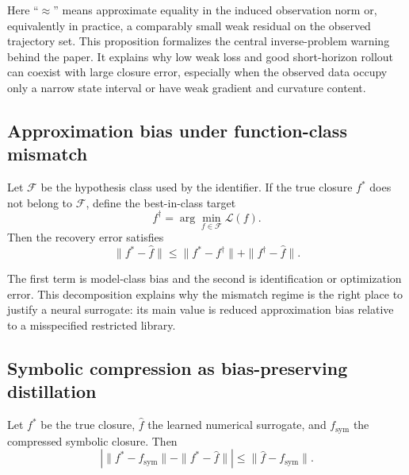 Here ``$\approx$'' means approximate equality in the induced observation norm or, equivalently in practice, a comparably small weak residual on the observed trajectory set. This proposition formalizes the central inverse-problem warning behind the paper. It explains why low weak loss and good short-horizon rollout can coexist with large closure error, especially when the observed data occupy only a narrow state interval or have weak gradient and curvature content.

\subsection{Approximation bias under function-class mismatch}

\begin{proposition}
Let $\mathcal{F}$ be the hypothesis class used by the identifier. If the true closure $f^\ast$ does not belong to $\mathcal{F}$, define the best-in-class target
\begin{equation}
f^\dagger = \arg \min_{f \in \mathcal{F}} \mathcal{L}(f).
\end{equation}
Then the recovery error satisfies
\begin{equation}
\|f^\ast - \widehat{f}\|
\le
\|f^\ast - f^\dagger\|
+ \|f^\dagger - \widehat{f}\|.
\end{equation}
\end{proposition}

The first term is model-class bias and the second is identification or optimization error. This decomposition explains why the mismatch regime is the right place to justify a neural surrogate: its main value is reduced approximation bias relative to a misspecified restricted library.

\subsection{Symbolic compression as bias-preserving distillation}

\begin{proposition}
Let $f^\ast$ be the true closure, $\widehat{f}$ the learned numerical surrogate, and $f_{\text{sym}}$ the compressed symbolic closure. Then
\begin{equation}
\left| \|f^\ast - f_{\text{sym}}\| - \|f^\ast - \widehat{f}\| \right|
\le
\|\widehat{f} - f_{\text{sym}}\|.
\label{eq:bias_preservation}
\end{equation}
\end{proposition}

